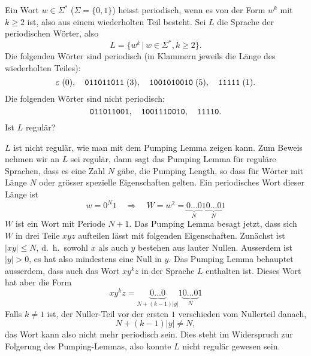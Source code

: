 Ein Wort $w\in\Sigma^*$ ($\Sigma=\{0,1\}$) heisst periodisch, wenn
es von der Form $w^k$ mit $k\ge 2$  ist, also aus einem wiederholten
Teil besteht. Sei $L$ die Sprache der periodischen Wörter, also
\[
L=\{w^k \,|\,w\in\Sigma^*,k\ge 2\}.
\]
Die folgenden Wörter sind periodisch (in Klammern jeweils die Länge
des wiederholten Teiles):
\[
\varepsilon\;(0),\quad
\text{\tt 011011011}\;(3),\quad
\text{\tt 1001010010}\;(5),\quad
\text{\tt 11111}\;(1).
\]
Die folgenden Wörter sind nicht periodisch:
\[
\text{\tt 011011001},\quad
\text{\tt 1001110010},\quad
\text{\tt 11110}.
\]
Ist $L$ regulär?


\begin{loesung}
$L$ ist nicht regulär, wie man mit dem Pumping Lemma zeigen kann. Zum Beweis
nehmen wir an $L$ sei regulär, dann sagt das Pumping Lemma für
reguläre Sprachen, dass es
eine Zahl $N$ gäbe, die Pumping Length, so dass für Wörter mit
Länge $N$ oder grösser spezielle Eigenschaften gelten.
Ein periodisches Wort dieser Länge ist
\[
w=0^N1\quad\Rightarrow\quad
W=w^2=\underbrace{0\dots 0}_N1\underbrace{0\dots 0}_N1
\]
$W$ ist ein Wort mit Periode $N+1$. Das Pumping Lemma besagt jetzt, dass
sich $W$ in drei Teile $xyz$ aufteilen lässt mit folgenden Eigenschaften.
Zunächst ist $|xy|\le N$, d.~h.~sowohl $x$ als auch $y$ bestehen aus
lauter Nullen. Ausserdem ist $|y|>0$, es hat also mindestens eine Null
in $y$. Das Pumping Lemma behauptet ausserdem, dass auch das Wort
$xy^kz$ in der Sprache $L$ enthalten ist. Dieses Wort hat aber die
Form
\[
xy^kz=\underbrace{0\dots0}_{N+(k-1)|y|}1\underbrace{0\dots 0}_N1
\]
Falls $k\ne 1$ ist, der Nuller-Teil vor der ersten $1$ verschieden vom
Nullerteil danach,
\[
N+(k-1)|y|\ne N,
\]
das Wort kann also nicht mehr periodisch
sein. Dies steht im Widerspruch zur Folgerung des Pumping-Lemmas, also
konnte $L$ nicht regulär gewesen sein.
\end{loesung}
